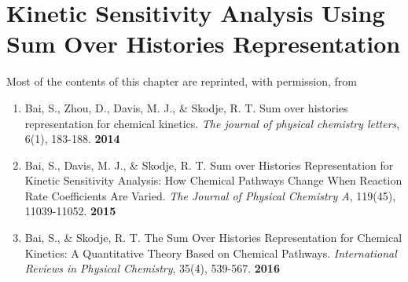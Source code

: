 \chapter{Kinetic Sensitivity Analysis Using Sum Over Histories Representation}
\label{chapter3}
Most of the contents of this chapter are reprinted, with permission, from \
\begin{enumerate}
\item[\cite{ch1_IRPC_16_ch3_6_ch4_8_bai2014sum}] Bai, S., Zhou, D., Davis, M. J., \& Skodje, R. T. Sum over histories representation for chemical kinetics. \textit{The journal of physical chemistry letters}, 6(1), 183-188. \textbf{2014}
\item[\cite{ch1_IRPC_17_ch4_9_bai2015sum}] Bai, S., Davis, M. J., \& Skodje, R. T. Sum over Histories Representation for Kinetic Sensitivity Analysis: How Chemical Pathways Change When Reaction Rate Coefficients Are Varied. \textit{The Journal of Physical Chemistry A}, 119(45), 11039-11052. \textbf{2015}
\item[\cite{ch4_10_bai2016sum}] Bai, S., \& Skodje, R. T. The Sum Over Histories Representation for Chemical Kinetics: A Quantitative Theory Based on Chemical Pathways. \textit{International Reviews in Physical Chemistry}, 35(4), 539-567. \textbf{2016}
\end{enumerate}

